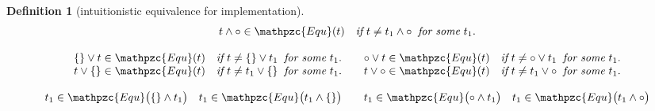 \documentclass[12pt]{article}
\newtheorem{Definition}{Definition}[section]
\begin{document}
\begin{Definition}[intuitionistic equivalence for implementation]
\begin{displaymath}
\begin{array}{c}
\begin{array}{ll}
\begin{array}{l}
             t \wedge \circ \in \mathpzc{Equ}(t)\quad \text{\it if}\
              t \neq t_1 \wedge \circ\;\; \text{\it for some}\ t_1.  \\
          \end{array}
      \end{array}  \\
      \\

      \begin{array}{ll}
        \begin{array}{l}
          \{\} \vee t \in \mathpzc{Equ}(t)\quad \text{\it if}\ t \neq \{\}
           \vee t_1\;\; \text{\it for some}\ t_1.  \\
          
           t \vee \{\} \in \mathpzc{Equ}(t)\quad \text{\it if}\ t \neq t_1
            \vee \{\}\;\; \text{\it for some}\ t_1.  \\
        \end{array}
        & \begin{array}{l}
            \circ \vee t \in \mathpzc{Equ}(t)\quad \text{\it if}\
             t \neq \circ \vee t_1\;\; \text{\it for some}\ t_1.  \\
             
             t \vee \circ \in \mathpzc{Equ}(t)\quad \text{\it if}\
             t \neq t_1 \vee \circ\;\; \text{\it for some}\ t_1.
          \end{array}
      \end{array}  \\   
      \\
      
      \begin{array}{ll}
        \begin{array}{ll}
          t_1 \in \mathpzc{Equ}\bigl(\{\} \wedge t_1 \bigr)
          & t_1 \in \mathpzc{Equ}\bigl(t_1 \wedge \{\} \bigr)
        \end{array}
        & \begin{array}{ll}
            t_1 \in \mathpzc{Equ}\bigl(\circ \wedge t_1 \bigr)
            & t_1 \in \mathpzc{Equ}\bigl(t_1 \wedge \circ \bigr)
          \end{array}
      \end{array}  \\
      \\
      

\end{array}
\end{displaymath}
\end{Definition}
\end{document}
